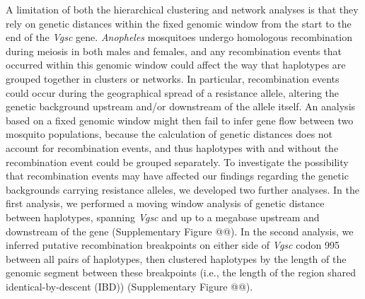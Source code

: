 \documentclass[a4paper,11pt,abstracton,hidelinks]{scrartcl}
\begin{document}
%
A limitation of both the hierarchical clustering and network analyses is that they rely on genetic distances within the fixed genomic window from the start to the end of the \textit{Vgsc} gene.
%
\textit{Anopheles} mosquitoes undergo homologous recombination during meiosis in both males and females, and any recombination events that occurred within this genomic window could affect the way that haplotypes are grouped together in clusters or networks.
%
In particular, recombination events could occur during the geographical spread of a resistance allele, altering the genetic background upstream and/or downstream of the allele itself.
%
An analysis based on a fixed genomic window might then fail to infer gene flow between two mosquito populations, because the calculation of genetic distances does not account for recombination events, and thus haplotypes with and without the recombination event could be grouped separately.
%
To investigate the possibility that recombination events may have affected our findings regarding the genetic backgrounds carrying resistance alleles, we developed two further analyses.
%
In the first analysis, we performed a moving window analysis of genetic distance between haplotypes, spanning \textit{Vgsc} and up to a megabase upstream and downstream of the gene (Supplementary Figure @@).
%
In the second analysis, we inferred putative recombination breakpoints on either side of \textit{Vgsc} codon 995 between all pairs of haplotypes, then clustered haplotypes by the length of the genomic segment between these breakpoints (i.e., the length of the region shared identical-by-descent (IBD)) (Supplementary Figure @@).
%
\end{document}
